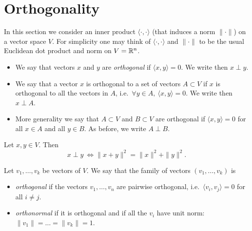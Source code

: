 \documentclass[11pt,nocut]{article}
\begin{document}
\section{Orthogonality}

In this section we consider an inner product $\langle \cdot, \cdot \rangle$ (that induces a norm $\| \cdot \|$) on a vector space $V$. For simplicity one may think of $\langle \cdot, \cdot \rangle$ and $\| \cdot \|$ to be the usual Euclidean dot product and norm on $V = \mathbb{R}^n$.

\begin{definition}[Orthogonality]
	\begin{itemize}
		\item We say that vectors $x$ and $y$ are \emph{orthogonal} if $\langle x,y \rangle = 0$. We write then $x \perp y$.
		\item We say that a vector $x$ is orthogonal to a set of vectors $A \subset V$ if $x$ is orthogonal to all the vectors in $A$, i.e.\ $\forall y \in A, \ \langle x,y\rangle = 0$. We write then $x \perp A$.
		\item More generality we say that $A \subset V$ and $B \subset V$ are orthogonal if $\langle x,y \rangle = 0$ for all $x \in A$ and all $y \in B$. As before, we write $A \perp B$.
	\end{itemize}
\end{definition}



\begin{theorem}
	Let $x,y \in V$. Then
	$$
	x \perp y \ \Longleftrightarrow \|x+y\|^2 = \|x\|^2 + \|y\|^2.
	$$
\end{theorem}


\begin{definition}
	Let $v_1, \dots, v_k$ be vectors of $V$. We say that the family of vectors $(v_1, \dots, v_k)$ is
	\begin{itemize}
		\item \emph{orthogonal} if the vectors $v_1, \dots, v_n$ are pairwise orthogonal, i.e.\ $\langle v_i, v_j \rangle = 0$ for all $i \neq j$.
		\item \emph{orthonormal} if it is orthogonal and if all the $v_i$ have unit norm: $\|v_1\| = \dots = \|v_k\| = 1$.
	\end{itemize}
\end{definition}
\end{document}
